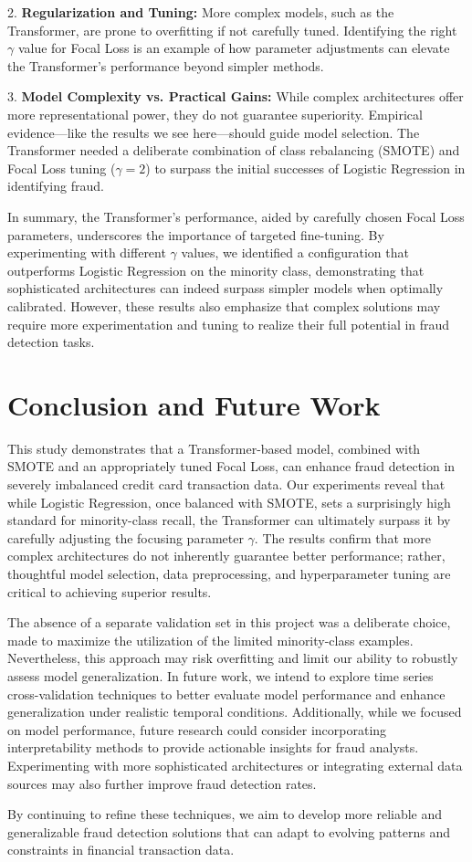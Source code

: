\documentclass[11pt, oneside]{article}   	%
\begin{document}
2. \textbf{Regularization and Tuning:} More complex models, such as the Transformer, are prone to overfitting if not carefully tuned. Identifying the right \(\gamma\) value for Focal Loss is an example of how parameter adjustments can elevate the Transformer's performance beyond simpler methods.

3. \textbf{Model Complexity vs. Practical Gains:} While complex architectures offer more representational power, they do not guarantee superiority. Empirical evidence—like the results we see here—should guide model selection. The Transformer needed a deliberate combination of class rebalancing (SMOTE) and Focal Loss tuning (\(\gamma = 2\)) to surpass the initial successes of Logistic Regression in identifying fraud.

In summary, the Transformer’s performance, aided by carefully chosen Focal Loss parameters, underscores the importance of targeted fine-tuning. By experimenting with different \(\gamma\) values, we identified a configuration that outperforms Logistic Regression on the minority class, demonstrating that sophisticated architectures can indeed surpass simpler models when optimally calibrated. However, these results also emphasize that complex solutions may require more experimentation and tuning to realize their full potential in fraud detection tasks.


\section{Conclusion and Future Work}

This study demonstrates that a Transformer-based model, combined with SMOTE and an appropriately tuned Focal Loss, can enhance fraud detection in severely imbalanced credit card transaction data. Our experiments reveal that while Logistic Regression, once balanced with SMOTE, sets a surprisingly high standard for minority-class recall, the Transformer can ultimately surpass it by carefully adjusting the focusing parameter \(\gamma\). The results confirm that more complex architectures do not inherently guarantee better performance; rather, thoughtful model selection, data preprocessing, and hyperparameter tuning are critical to achieving superior results.

The absence of a separate validation set in this project was a deliberate choice, made to maximize the utilization of the limited minority-class examples. Nevertheless, this approach may risk overfitting and limit our ability to robustly assess model generalization. In future work, we intend to explore time series cross-validation techniques to better evaluate model performance and enhance generalization under realistic temporal conditions. Additionally, while we focused on model performance, future research could consider incorporating interpretability methods to provide actionable insights for fraud analysts. Experimenting with more sophisticated architectures or integrating external data sources may also further improve fraud detection rates.

By continuing to refine these techniques, we aim to develop more reliable and generalizable fraud detection solutions that can adapt to evolving patterns and constraints in financial transaction data.

\newpage


\end{document}

